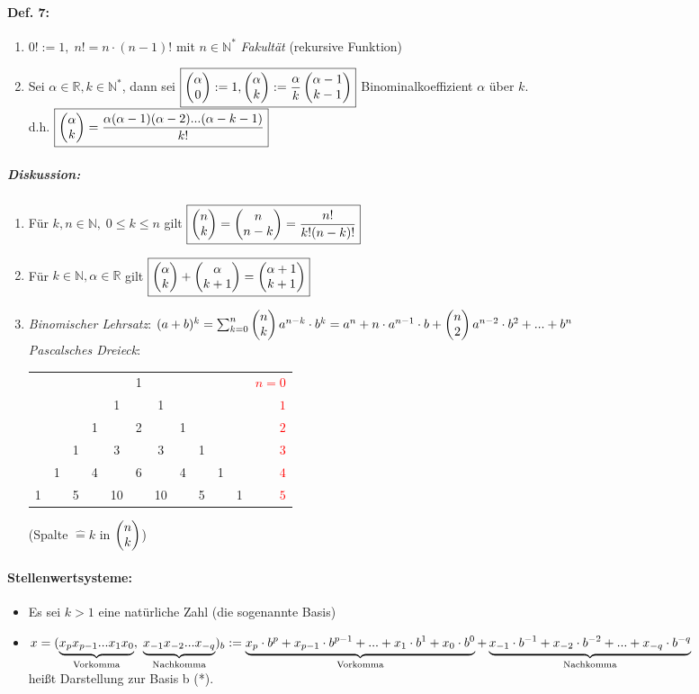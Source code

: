 \paragraph{Def. 7:}
\begin{enumerate}[label=\alph*.)]
\item $\boxed{0! := 1, \; n!=n\cdot (n-1)!}$ mit $n\in \mathbb{N}^*$ \emph{Fakultät} (rekursive Funktion)
\item Sei $\alpha \in \mathbb{R}, k\in \mathbb{N}^*$, dann sei $\boxed{\begin{pmatrix}\alpha\\0\end{pmatrix}:=1, \begin{pmatrix}\alpha\\k\end{pmatrix}:= \frac{\alpha}{k}\begin{pmatrix}\alpha-1\\k-1\end{pmatrix}}$ Binominalkoeffizient $\alpha$ über $k$.\\
d.h. $\boxed{\begin{pmatrix}\alpha\\k\end{pmatrix}= \frac{\alpha(\alpha-1)(\alpha-2)...(\alpha-k-1)}{k!}}$
\end{enumerate}

\subparagraph{Diskussion:}
\begin{enumerate}
\item Für $k, n \in \mathbb{N}, \; 0 \leq k \leq n$ gilt $\boxed{\begin{pmatrix}n\\k\end{pmatrix}=\begin{pmatrix}n\\n-k\end{pmatrix}=\frac{n!}{k!(n-k)!}}$
\item Für $k \in \mathbb{N}, \alpha \in \mathbb{R}$ gilt $\boxed{\begin{pmatrix}\alpha\\k\end{pmatrix}+\begin{pmatrix}\alpha\\k+1\end{pmatrix}=\begin{pmatrix}\alpha+1\\k+1\end{pmatrix}}$
\item \emph{Binomischer Lehrsatz}: $(a+b)^k=\sum_{k=0}^n \begin{pmatrix}n\\k\end{pmatrix} a^{n-k} \cdot b^k=a^n+n\cdot a^{n-1} \cdot b + \begin{pmatrix}n\\2\end{pmatrix}a^{n-2}\cdot b^2+...+b^n$\\
\emph{Pascalsches Dreieck}:
\begin{tabular}{c c c c c c c c c c c r}
   &   &   &   &   & 1 &   &   &   &   &   & \textcolor{red}{$n=0$} \\
   &   &   &   & 1 &   & 1 &   &   &   &   & \textcolor{red}{$1$} \\
   &   &   & 1 &   & 2 &   & 1 &   &   &   & \textcolor{red}{$2$} \\
   &   & 1 &   & 3 &   & 3 &   & 1 &   &   & \textcolor{red}{$3$} \\
   & 1 &   & 4 &   & 6 &   & 4 &   & 1 &   & \textcolor{red}{$4$} \\
 1 &   & 5 &   & 10&   & 10&   & 5 &   & 1 & \textcolor{red}{$5$} \\

\end{tabular}
(Spalte $\hat{=}k$ in $\begin{pmatrix}n\\k\end{pmatrix}$)
\end{enumerate}

\paragraph{Stellenwertsysteme:}
\begin{itemize}
\item Es sei $k>1$ eine natürliche Zahl (die sogenannte Basis)
\item $x = (\underbrace{x_p x_{p-1}...x_1x_0}_{\text{Vorkomma}},\;\underbrace{x_{-1}x_{-2}...x_{-q}}_{\text{Nachkomma}})_b\\
:= \underbrace{x_p\cdot b^p+x_{p-1}\cdot b^{p-1}+...+x_1\cdot b^1+x_0\cdot b^0}_{\text{Vorkomma}}+\underbrace{x_{-1}\cdot b^{-1}+x_{-2}\cdot b^{-2}+...+x_{-q}\cdot b^{-q}}_{\text{Nachkomma}}$\\
heißt Darstellung zur Basis b (*).
\end{itemize}

